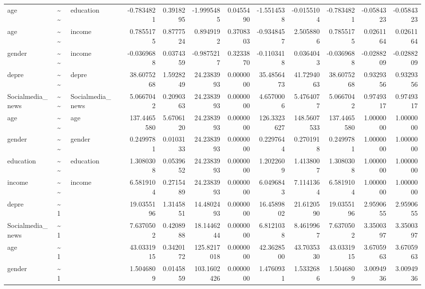 \documentclass[
]{article}
\begin{document}
\begin{table}[!h]
\begin{tabular}[t]{llllrrrrrrrrr}
age & \textasciitilde{}\textasciitilde{} & education &  & -0.7834821 & 0.3918295 & -1.9995485 & 0.0455490 & -1.5514538 & -0.0155104 & -0.7834821 & -0.0584323 & -0.0584323\\
age & \textasciitilde{}\textasciitilde{} & income &  & 0.7855175 & 0.8777524 & 0.8949192 & 0.3708303 & -0.9348457 & 2.5058806 & 0.7855175 & 0.0261164 & 0.0261164\\
gender & \textasciitilde{}\textasciitilde{} & income &  & -0.0369688 & 0.0374359 & -0.9875217 & 0.3233870 & -0.1103418 & 0.0364043 & -0.0369688 & -0.0288209 & -0.0288209\\
\addlinespace
depre & \textasciitilde{}\textasciitilde{} & depre &  & 38.6075268 & 1.5928249 & 24.2383993 & 0.0000000 & 35.4856473 & 41.7294063 & 38.6075268 & 0.9329356 & 0.9329356\\
Socialmedia\_news & \textasciitilde{}\textasciitilde{} & Socialmedia\_news &  & 5.0667042 & 0.2090363 & 24.2383993 & 0.0000000 & 4.6570006 & 5.4764077 & 5.0667042 & 0.9749317 & 0.9749317\\
age & \textasciitilde{}\textasciitilde{} & age &  & 137.4465580 & 5.6706120 & 24.2383993 & 0.0000000 & 126.3323627 & 148.5607533 & 137.4465580 & 1.0000000 & 1.0000000\\
gender & \textasciitilde{}\textasciitilde{} & gender &  & 0.2499781 & 0.0103133 & 24.2383993 & 0.0000000 & 0.2297644 & 0.2701918 & 0.2499781 & 1.0000000 & 1.0000000\\
education & \textasciitilde{}\textasciitilde{} & education &  & 1.3080308 & 0.0539652 & 24.2383993 & 0.0000000 & 1.2022609 & 1.4138007 & 1.3080308 & 1.0000000 & 1.0000000\\
\addlinespace
income & \textasciitilde{}\textasciitilde{} & income &  & 6.5819104 & 0.2715489 & 24.2383993 & 0.0000000 & 6.0496843 & 7.1141364 & 6.5819104 & 1.0000000 & 1.0000000\\
depre & \textasciitilde{}1 &  &  & 19.0355196 & 1.3145851 & 14.4802493 & 0.0000000 & 16.4589802 & 21.6120590 & 19.0355196 & 2.9590655 & 2.9590655\\
Socialmedia\_news & \textasciitilde{}1 &  &  & 7.6370502 & 0.4208988 & 18.1446244 & 0.0000000 & 6.8121038 & 8.4619967 & 7.6370502 & 3.3500397 & 3.3500397\\
age & \textasciitilde{}1 &  &  & 43.0331915 & 0.3420172 & 125.8217018 & 0.0000000 & 42.3628500 & 43.7035330 & 43.0331915 & 3.6705963 & 3.6705963\\
gender & \textasciitilde{}1 &  &  & 1.5046809 & 0.0145859 & 103.1602426 & 0.0000000 & 1.4760931 & 1.5332686 & 1.5046809 & 3.0094936 & 3.0094936\\

\end{tabular}
\end{table}
\end{document}
